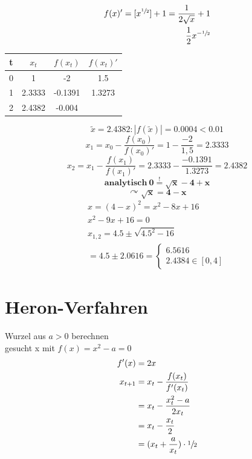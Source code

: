 \documentclass[14pt,a4paper]{extarticle}
\begin{document}

	\begin{eqnarray*}
		f(x)'=[x^{\sfrac{1}{2}}] + 1 = \frac{1}{2\sqrt{x}} + 1 \\
		\frac{1}{2}x^{-\sfrac{1}{2}}
	\end{eqnarray*}

	\begin{table}[h!]
  		\centering
  		\label{tab:table1}
  		\begin{tabular}{c | c c c}
    		t & ${x_t}$ & $f(x_t)$ & $f(x_t)'$\\
    		\hline
    		0 & 1 & -2 & 1.5\\
    		1 & 2.3333 & -0.1391 & 1.3273\\
    		2 & 2.4382 & -0.004 & \\
  		\end{tabular}
	\end{table}
	\[\tilde{x} = 2.4382 : |f(\tilde{x})|=0.0004 < 0.01 \]
	\[x_1=x_0 - \frac{f(x_0)}{f(x_0)'} = 1 - \frac{-2}{1,5} = 2.3333 \]
	\[x_2=x_1 - \frac{f(x_1)}{f(x_1)'} = 2.3333 - \frac{-0.1391}{1.3273}	= 2.4382
	\]
	\[\pmb{analytisch \ 0 \stackrel{!}{=} \sqrt{x}-4+x}\]
	\[\pmb{\curvearrowright \sqrt{x} = 4-x}\]
	\begin{align*}
	x = (4-x)^2=x^2-8x+16 \\
	x^2 -9x + 16 = 0 \\
	x_{1,2}=4.5\pm\sqrt{4.5^2-16} \\
	=4.5\pm 2.0616=
    \begin{cases}
		6.5616  \\
		2.4384 \in [0,4]
	\end{cases}	
	\end{align*}
	\section{Heron-Verfahren}
	Wurzel aus \begin{math} a > 0 \end{math} berechnen \\
	gesucht x mit \begin{math} f(x) = x^2 - a = 0 \end{math}
	\begin{align*}
	f'(x)&=2x \\
	x_{t+1}&=x_t-\frac{f(x_t)}{f'(x_t)} \\
	&=x_t-\frac{x_t^2-a}{2x_t} \\
	&=x_t-\frac{x_t}{2} \\
	&=(x_t+\frac{a}{x_t})\cdot\sfrac{1}{2}
	\end{align*}
\end{document}
